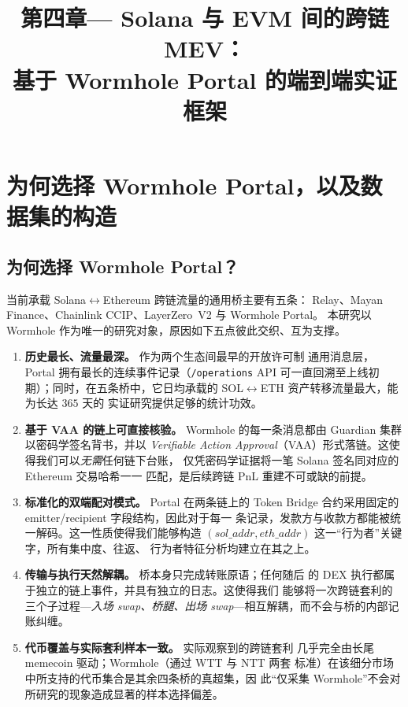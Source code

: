 \documentclass[11pt,a4paper]{ctexart}
\title{\textbf{第四章\;\;---\;\; Solana 与 EVM 间的跨链 MEV：\\
    基于 Wormhole Portal 的端到端实证框架}}
\author{}
\date{}
\begin{document}
\maketitle

\section{为何选择 Wormhole Portal，以及数据集的构造}
\label{sec:ch4-data}

\subsection{为何选择 Wormhole Portal？}

当前承载 Solana$\leftrightarrow$Ethereum 跨链流量的通用桥主要有五条：
Relay、Mayan Finance、Chainlink CCIP、LayerZero~V2 与 Wormhole Portal。
本研究以 Wormhole 作为唯一的研究对象，原因如下五点彼此交织、互为支撑。

\begin{enumerate}
    \item \textbf{历史最长、流量最深。} 作为两个生态间最早的开放许可制
        通用消息层，Portal 拥有最长的连续事件记录（\texttt{/operations}
        API 可一直回溯至上线初期）；同时，在五条桥中，它日均承载的
        SOL$\leftrightarrow$ETH 资产转移流量最大，能为长达 $365$ 天的
        实证研究提供足够的统计功效。
    \item \textbf{基于 VAA 的链上可直接核验。} Wormhole 的每一条消息都由
        Guardian 集群以密码学签名背书，并以 \emph{Verifiable Action
        Approval}（VAA）形式落链。这使得我们可以\emph{无需}任何链下台账，
        仅凭密码学证据将一笔 Solana 签名同对应的 Ethereum 交易哈希一一
        匹配，是后续跨链 PnL 重建不可或缺的前提。
    \item \textbf{标准化的双端配对模式。} Portal 在两条链上的 Token
        Bridge 合约采用固定的 emitter/recipient 字段结构，因此对于每一
        条记录，发款方与收款方都能被统一解码。这一性质使得我们能够构造
        $(sol\_addr, eth\_addr)$ 这一“行为者”关键字，所有集中度、往返、
        行为者特征分析均建立在其之上。
    \item \textbf{传输与执行天然解耦。} 桥本身只完成转账原语；任何随后
        的 DEX 执行都属于独立的链上事件，并具有独立的日志。这使得我们
        能够将一次跨链套利的三个子过程---\emph{入场 swap、桥腿、出场
        swap}---相互解耦，而不会与桥的内部记账纠缠。
    \item \textbf{代币覆盖与实际套利样本一致。} 实际观察到的跨链套利
        几乎完全由长尾 memecoin 驱动；Wormhole（通过 WTT 与 NTT 两套
        标准）在该细分市场中所支持的代币集合是其余四条桥的真超集，因
        此“仅采集 Wormhole”不会对所研究的现象造成显著的样本选择偏差。
\end{enumerate}
\end{document}

